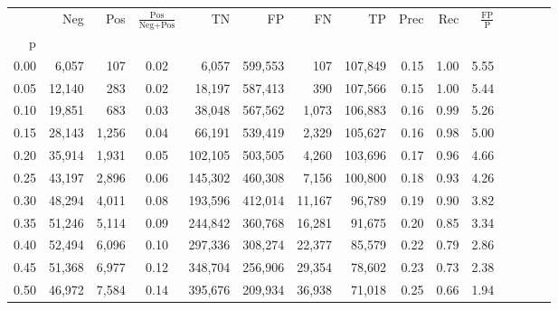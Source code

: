 \begin{tabular}{rrrcrrrrrrrrrrr}
\toprule
{} &     Neg &    Pos & $\frac{\text{Pos}}{\text{Neg}+\text{Pos}}$ &       TN &       FP &       FN &       TP &  Prec &   Rec & $\frac{\text{FP}}{\text{P}}$ \\
p    &         &        &                                            &          &          &          &          &       &       &                              \\
\midrule
0.00 &   6,057 &    107 &                                       0.02 &    6,057 &  599,553 &      107 &  107,849 &  0.15 &  1.00 &                         5.55 \\
0.05 &  12,140 &    283 &                                       0.02 &   18,197 &  587,413 &      390 &  107,566 &  0.15 &  1.00 &                         5.44 \\
0.10 &  19,851 &    683 &                                       0.03 &   38,048 &  567,562 &    1,073 &  106,883 &  0.16 &  0.99 &                         5.26 \\
0.15 &  28,143 &  1,256 &                                       0.04 &   66,191 &  539,419 &    2,329 &  105,627 &  0.16 &  0.98 &                         5.00 \\
0.20 &  35,914 &  1,931 &                                       0.05 &  102,105 &  503,505 &    4,260 &  103,696 &  0.17 &  0.96 &                         4.66 \\
0.25 &  43,197 &  2,896 &                                       0.06 &  145,302 &  460,308 &    7,156 &  100,800 &  0.18 &  0.93 &                         4.26 \\
0.30 &  48,294 &  4,011 &                                       0.08 &  193,596 &  412,014 &   11,167 &   96,789 &  0.19 &  0.90 &                         3.82 \\
0.35 &  51,246 &  5,114 &                                       0.09 &  244,842 &  360,768 &   16,281 &   91,675 &  0.20 &  0.85 &                         3.34 \\
0.40 &  52,494 &  6,096 &                                       0.10 &  297,336 &  308,274 &   22,377 &   85,579 &  0.22 &  0.79 &                         2.86 \\
0.45 &  51,368 &  6,977 &                                       0.12 &  348,704 &  256,906 &   29,354 &   78,602 &  0.23 &  0.73 &                         2.38 \\
0.50 &  46,972 &  7,584 &                                       0.14 &  395,676 &  209,934 &   36,938 &   71,018 &  0.25 &  0.66 &                         1.94 \\

\end{tabular}
